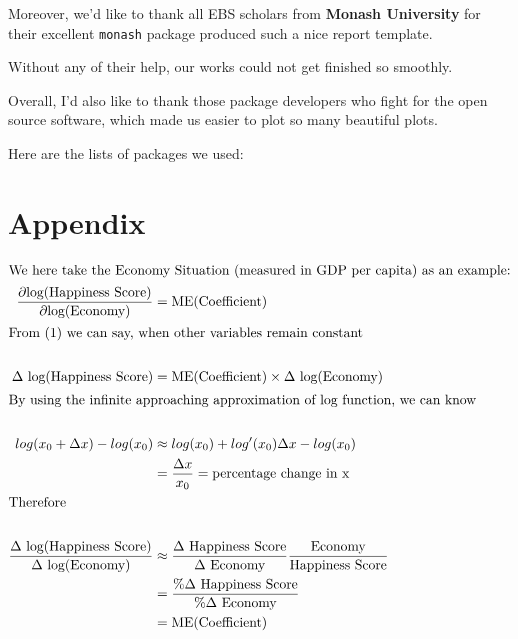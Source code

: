 \documentclass[11pt,a4paper,]{article}
\begin{document}
Moreover, we'd like to thank all EBS scholars from \textbf{Monash University} for their excellent \texttt{monash} package produced such a nice report template.

Without any of their help, our works could not get finished so smoothly.

Overall, I'd also like to thank those package developers who fight for the open source software, which made us easier to plot so many beautiful plots.

Here are the lists of packages we used:

\clearpage

\hypertarget{appendix}{%
\section{Appendix}\label{appendix}}

\begin{align*}
\intertext{We here take the Economy Situation (measured in GDP per capita) as an example:}
\frac{\partial \text{log(Happiness Score)}}{\partial \text{log(Economy)}} &= \text{ME(Coefficient)}\\
\intertext{From (1) we can say, when other variables remain constant }\nonumber \\
\Delta \text{ log(Happiness Score)} &= \text{ME(Coefficient)} \times \Delta \text{ log(Economy)}\\
\intertext{By using the infinite approaching approximation of log function, we can know}\nonumber\\
log(x_0 + \Delta x) - log(x_0) &\approx log(x_0) + log'(x_0)\Delta x - log(x_0)\\
&=  \frac{\Delta x}{x_0} = \text{percentage change in x}\nonumber\\
\intertext{Therefore}\nonumber\\
\frac{\Delta \text{ log(Happiness Score)}}{\Delta \text{ log(Economy)}} &\approx \frac{\Delta \text{ Happiness Score}}{\Delta \text{ Economy} }\frac{\text{Economy}}{\text{Happiness Score}}\\
&=\frac{\% \Delta \text{ Happiness Score}}{\% \Delta \text{ Economy}} \nonumber\\
&= \text{ME(Coefficient)}\nonumber
\end{align*}
\end{document}
